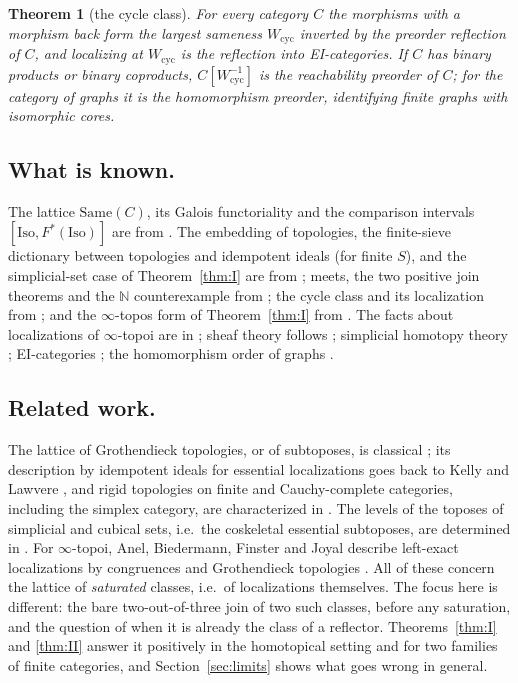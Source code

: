 \documentclass[11pt]{amsart}
\newtheorem{thm}{Theorem}[section]
\theoremstyle{definition}
\newcommand{\Same}{\mathrm{Same}}
\newcommand{\Iso}{\mathrm{Iso}}
\newcommand{\Wcyc}{W_{\mathrm{cyc}}}
\begin{document}
\begin{thm}[the cycle class]\label{thm:III}
For every category $C$ the morphisms with a morphism back form the largest
sameness $\Wcyc$ inverted by the preorder reflection of $C$, and localizing at
$\Wcyc$ is the reflection into EI-categories. If $C$ has binary products or
binary coproducts, $C[\Wcyc^{-1}]$ is the reachability preorder of $C$; for
the category of graphs it is the homomorphism preorder, identifying finite
graphs with isomorphic cores.
\end{thm}

\subsection*{What is known.}
The lattice $\Same(C)$, its Galois functoriality and the comparison intervals
$[\Iso,F^*(\Iso)]$ are from \cite{Same}. The embedding of topologies, the
finite-sieve dictionary between topologies and idempotent ideals (for finite
$S$), and the simplicial-set case of Theorem~\ref{thm:I} are from
\cite{Postnikov}; meets, the two positive join theorems and the $\mathbb N$
counterexample from \cite{Topjoin}; the cycle class and its localization from
\cite{EI}; and the $\infty$-topos form of Theorem~\ref{thm:I} from
\cite{Infjoin}. The facts about localizations of $\infty$-topoi are in
\cite{HTT,ABFJ}; sheaf theory follows \cite{MLM,Elephant}; simplicial homotopy
theory \cite{GJ}; EI-categories \cite{Lueck}; the homomorphism order of graphs
\cite{HN}.

\subsection*{Related work.}
The lattice of Grothendieck topologies, or of subtoposes, is classical
\cite{MLM,Elephant}; its description by idempotent ideals for essential
localizations goes back to Kelly and Lawvere \cite{KL89}, and rigid topologies
on finite and Cauchy-complete categories, including the simplex category, are
characterized in \cite{Marques25}. The levels of the toposes of simplicial and
cubical sets, i.e.\ the coskeletal essential subtoposes, are determined in
\cite{KRRZ}. For $\infty$-topoi, Anel, Biedermann, Finster and Joyal describe
left-exact localizations by congruences and Grothendieck topologies
\cite{ABFJ,ABFJ2}. All of these concern the lattice of \emph{saturated}
classes, i.e.\ of localizations themselves. The focus here is different: the
bare two-out-of-three join of two such classes, before any saturation, and the
question of when it is already the class of a reflector. Theorems~\ref{thm:I}
and \ref{thm:II} answer it positively in the homotopical setting and for two
families of finite categories, and Section~\ref{sec:limits} shows what goes
wrong in general.
\end{document}
